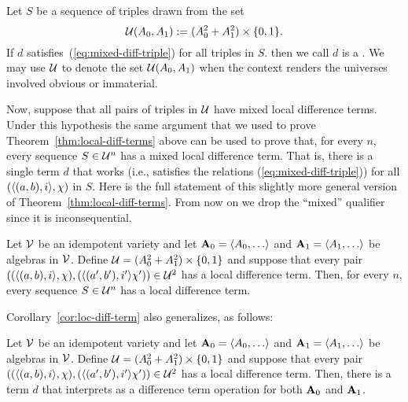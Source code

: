 Let $S$ be a sequence of triples drawn from the set
\[
\mathcal{U}(A_0, A_1)  := (A_0^2 + A_1^2) \times \{0,1\}.
\]
If $d$ satisfies~(\ref{eq:mixed-diff-triple}) for all triples in $S$.
then we call $d$ is a .
We may use $\mathcal{U}$ to denote the set $\mathcal{U}(A_0, A_1)$ when the context renders the
universes involved obvious or immaterial.

Now, suppose that all pairs of triples
in $\mathcal{U}$ have mixed local difference terms.
Under this hypothesis the same argument that we used to prove
Theorem~\ref{thm:local-diff-terms} above can be used to prove that, for every $n$,
every sequence $S\in \mathcal{U}^n$ has a mixed local difference term.
That is, there is a single term $d$ that works (i.e., satisfies
the relations (\ref{eq:mixed-diff-triple})) for all $(\langle(a, b), i\rangle,\chi)$ in $S$.
Here is the full statement of this slightly more general version of
Theorem~\ref{thm:local-diff-terms}.
From now on we drop the ``mixed'' qualifier since
it is inconsequential.

\begin{thm} %
  \label{thm:mixed-local-diff-terms}
  Let $\mathcal{V}$ be an idempotent variety and let
  $\bA_0 = \<A_0, \dots\>$ and   $\bA_1 = \<A_1, \dots\>$ be algebras in $\mathcal{V}$. Define
  $\mathcal{U}  = (A_0^2 + A_1^2)\times \{0,1\}$
  and suppose that every pair
  $((\langle(a, b), i\rangle, \chi), (\langle(a', b'), i'\rangle\chi')) \in \mathcal{U}^2$
  has a local difference term. Then, for every $n$, every sequence $S \in \mathcal{U}^n$
  has a local difference term.
\end{thm}

Corollary~\ref{cor:loc-diff-term} also generalizes, as follows:
\begin{cor}
  \label{cor:mix-loc-diff-term}
  Let $\mathcal{V}$ be an idempotent variety and let
  $\bA_0 = \<A_0, \dots\>$ and   $\bA_1 = \<A_1, \dots\>$ be algebras in $\mathcal{V}$. Define
  $\mathcal{U}  = (A_0^2 + A_1^2)\times \{0,1\}$
  and suppose that every pair
  $((\langle(a, b), i\rangle, \chi), (\langle(a', b'), i'\rangle\chi')) \in \mathcal{U}^2$
  has a local difference term. Then, there is a term $d$ that interprets as a
  difference term operation for both $\mathbf{A}_0$ and $\mathbf{A}_1$.
\end{cor}





